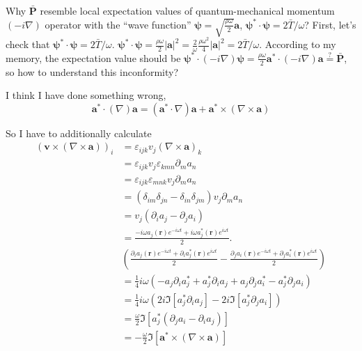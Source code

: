 Why $\bar{\boldsymbol{P}}$ resemble local expectation values of quantum-mechanical momentum $(-i\nabla)$ operator with the “wave function” $\boldsymbol{\psi}=\sqrt{\frac{\rho\omega}{2}}\boldsymbol{a}$, $\boldsymbol{\psi}^{*}\cdot \boldsymbol{\psi}=2\bar{T}/\omega$? First, let's check that $\boldsymbol{\psi}^{*}\cdot \boldsymbol{\psi}=2\bar{T}/\omega$. $\boldsymbol{\psi}^{*}\cdot \boldsymbol{\psi}=\frac{\rho\omega}{2}|\boldsymbol{a}|^2=\frac{2}{\omega}\frac{\rho\omega^2}{4}|\boldsymbol{a}|^2=2\bar{T}/\omega$. According to my memory, the expectation value should be $\boldsymbol{\psi}^{*}\cdot(-i\nabla)\boldsymbol{\psi}=\frac{\rho\omega}{2}\boldsymbol{a}^{*}\cdot (-i\nabla)\boldsymbol{a}\overset{?}{=}\bar{\boldsymbol{P}}$, so how to understand this inconformity?


I think I have done something wrong, $$
\boldsymbol{a}^{*}\cdot (\nabla)\boldsymbol{a}=(\boldsymbol{a}^{*}\cdot \nabla)\boldsymbol{a}+\boldsymbol{a}^{*}\times (\nabla\times \boldsymbol{a})
$$

So I have to additionally calculate
$$
\begin{aligned}
(\boldsymbol{v}\times (\nabla\times \boldsymbol{a}))_i&=\varepsilon_{ijk}v_j(\nabla\times \boldsymbol{a})_k\\
&=\varepsilon_{ijk}v_j\varepsilon_{kmn}\partial_{m}a_n\\
&=\varepsilon_{ijk}\varepsilon_{mnk}v_j\partial_{m}a_n\\
&=(\delta_{im}\delta_{jn}-\delta_{in}\delta_{jm})v_j\partial_{m}a_n\\
&=v_j(\partial_{i}a_j-\partial_ja_i)\\
&=\frac{-i\omega a_j(\boldsymbol{r})e^{-i\omega t}+i\omega a_j^{*}(\boldsymbol{r})e^{i\omega t}}{2}.\\
&\left(\frac{\partial_ia_j(\boldsymbol{r})e^{-i\omega t}+\partial_ia_j^{*}(\boldsymbol{r})e^{i\omega t}}{2}-\frac{\partial_ja_i(\boldsymbol{r})e^{-i\omega t}+\partial_ja_i^{*}(\boldsymbol{r})e^{i\omega t}}{2}\right)\\
&=\frac{1}{4}i\omega\left(-a_j\partial_ia_j^{*}+a^{*}_{j}\partial_ia_j+a_j\partial_ja_i^{*}-a_j^{*}\partial_ja_i\right)\\
&=\frac{1}{4}i\omega\left(2i\Im[a^{*}_{j}\partial_ia_j]-2i\Im[a_j^{*}\partial_ja_i]\right)\\
&=\frac{\omega}{2}\Im[a_{j}^{*}(\partial_ja_i-\partial_ia_j)]\\
&=-\frac{\omega}{2}\Im[\boldsymbol{a}^{*}\times(\nabla\times \boldsymbol{a})]
\end{aligned}
$$
